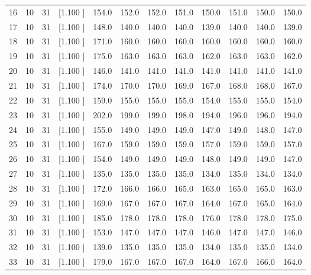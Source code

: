 \documentclass[12pt,a4paper]{article}
\begin{document}
\begin{center}
{\begin{tabular}{r r r r r r r r r r r r}
  16& 10& 31&[1.100     ]&   154.0&   152.0&   152.0&   151.0&   150.0&   151.0&   150.0&   150.0\\[-0.02in]
  17& 10& 31&[1.100     ]&   148.0&   140.0&   140.0&   140.0&   139.0&   140.0&   140.0&   139.0\\[-0.02in]
  18& 10& 31&[1.100     ]&   171.0&   160.0&   160.0&   160.0&   160.0&   160.0&   160.0&   160.0\\[-0.02in]
  19& 10& 31&[1.100     ]&   175.0&   163.0&   163.0&   163.0&   162.0&   163.0&   163.0&   162.0\\[-0.02in]
  20& 10& 31&[1.100     ]&   146.0&   141.0&   141.0&   141.0&   141.0&   141.0&   141.0&   141.0\\[-0.02in]
  21& 10& 31&[1.100     ]&   174.0&   170.0&   170.0&   169.0&   167.0&   168.0&   168.0&   167.0\\[-0.02in]
  22& 10& 31&[1.100     ]&   159.0&   155.0&   155.0&   155.0&   154.0&   155.0&   155.0&   154.0\\[-0.02in]
  23& 10& 31&[1.100     ]&   202.0&   199.0&   199.0&   198.0&   194.0&   196.0&   196.0&   194.0\\[-0.02in]
  24& 10& 31&[1.100     ]&   155.0&   149.0&   149.0&   149.0&   147.0&   149.0&   148.0&   147.0\\[-0.02in]
  25& 10& 31&[1.100     ]&   167.0&   159.0&   159.0&   159.0&   157.0&   159.0&   159.0&   157.0\\[-0.02in]
  26& 10& 31&[1.100     ]&   154.0&   149.0&   149.0&   149.0&   148.0&   149.0&   149.0&   147.0\\[-0.02in]
  27& 10& 31&[1.100     ]&   135.0&   135.0&   135.0&   135.0&   134.0&   135.0&   134.0&   134.0\\[-0.02in]
  28& 10& 31&[1.100     ]&   172.0&   166.0&   166.0&   165.0&   163.0&   165.0&   165.0&   163.0\\[-0.02in]
  29& 10& 31&[1.100     ]&   169.0&   167.0&   167.0&   167.0&   164.0&   167.0&   165.0&   164.0\\[-0.02in]
  30& 10& 31&[1.100     ]&   185.0&   178.0&   178.0&   178.0&   176.0&   178.0&   178.0&   175.0\\[-0.02in]
  31& 10& 31&[1.100     ]&   153.0&   147.0&   147.0&   147.0&   146.0&   147.0&   147.0&   146.0\\[-0.02in]
  32& 10& 31&[1.100     ]&   139.0&   135.0&   135.0&   135.0&   134.0&   135.0&   135.0&   134.0\\[-0.02in]
  33& 10& 31&[1.100     ]&   179.0&   167.0&   167.0&   167.0&   164.0&   167.0&   166.0&   164.0\\[-0.02in]

\end{tabular}}
\end{center}
\end{document}
